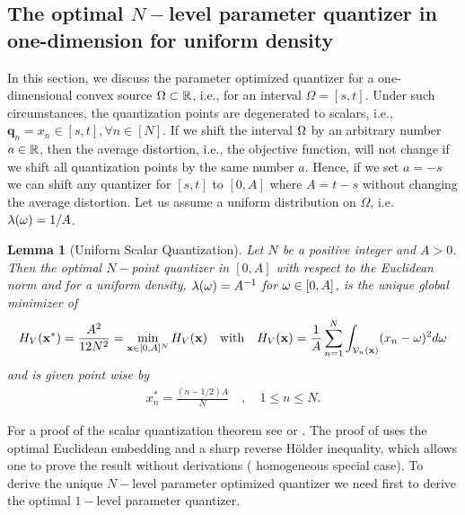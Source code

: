 \documentclass[smallabstract,smallcaptions]{dccpaper}
\newtheorem{lemma}{Lemma}
\renewcommand{\vp}{\mathbf q}
\newcommand{\df}{\ensuremath{\lam}}         %
\newcommand{\Vor}{\ensuremath{\mathcal{V}}}         %
\newcommand{\philippstart}{\color{black}}
\newcommand{\philippend}{\color{black}}
\begin{document}
\fi %

\subsection{The optimal $N-$level parameter quantizer in one-dimension for uniform density}

In this section, we discuss the parameter optimized quantizer for a one-dimensional convex source $\Omega\subset{\ensuremath{\mathbb R}}$, i.e.,
for an interval $\Omega = [s,t]$.  Under such circumstances, the quantization points are degenerated to scalars, i.e.,
$\vp_n=x_n\in[s, t], \forall n\in[N]$.  \philippstart If we shift the interval $\Omega$ by an arbitrary number
$a\in{\ensuremath{\mathbb R}}$, then the average distortion, i.e., the objective function, will not change if we shift all quantization points
by the same number $a$. Hence, if we set $a=-s$ we can shift any quantizer for $[s,t]$ to $[0,A]$ where $A=t-s$ without
changing the average distortion.   \philippend
%
Let us assume a uniform distribution on $\Omega$, i.e.  $\df(\ome)=1/A$. 
%
%
\begin{lemma}[Uniform Scalar Quantization]\label{lem:UniformScalarQuantizer}
  Let $N$ be a positive integer and $A>0$. Then the optimal $N-$point quantizer in $[0,A]$ with respect to the
  Euclidean norm and for a uniform density, $\lambda(\omega)=A^{-1}$ for $\omega\in[0,A]$,  is the unique global minimizer of
  \begin{align}
    H_V(\vx^*)=\frac{A^2}{12N^2}=\min_{\vx\in[0,A]^N} H_V(\vx) 
       \quad\text{with}\quad H_V(\vx)=\frac{1}{A}\sum_{n=1}^N \int_{\Vor_n(\vx)} (x_n-\ome)^2d\ome
  \end{align}
  and is given point wise by
  \begin{align}
    x_n^*= \frac{(n-1/2)A}{N} \quad, \quad 1\leq n\leq N.
  \end{align}
\end{lemma}
%
For a proof of the scalar quantization theorem see \cite{GN98} or
  \cite{Erdem}.  The proof of \cite[Thm.1]{Erdem} uses the optimal
  Euclidean  embedding and a sharp reverse Hölder inequality, which allows one to prove the result without derivations (
  homogeneous special case). 
\fi
%
To derive the unique $N-$level parameter optimized quantizer we need first to derive the optimal $1-$level parameter
quantizer.
%
\end{document}
